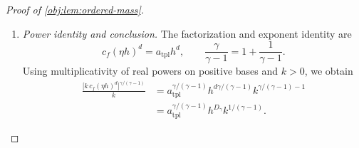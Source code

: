 \documentclass[11pt]{article}
\begin{document}
\begin{proof}[Proof of \cref{obj:lem:ordered-mass}]
\begin{enumerate}
More explicitly, each microcell is the rectangle
\[
E_{Q\ell}
=
\prod_{i=1}^d
\left[
(a_Q)_i+h\left((v_\ell)_i-\frac\eta2\right),
(a_Q)_i+h\left((v_\ell)_i+\frac\eta2\right)
\right].
\]
Each coordinate interval has length \(\eta h\), so
\[
\operatorname{Leb}(E_{Q\ell})=(\eta h)^d.
\]

By \cref{obj:ass:density}, integration of the density over each microcell yields
\[
\nu(E_{Q\ell})
=
\int_{E_{Q\ell}}f(x)\,dx
\ge c_f\operatorname{Leb}(E_{Q\ell})
=c_f(\eta h)^d.
\]
The selected microcells are measurable and pairwise disjoint. Thus
\[
\begin{aligned}
\nu(E_k)
&=
\sum_{Q\in\mathcal Q_{h,k}}
\nu(E_{Q,\ell_{\min}(Q)})\\
&\ge k\,c_f(\eta h)^d.
\end{aligned}
\]

The exponent \(\gamma/(\gamma-1)\) and the setwise coefficient are positive. Applying monotonicity of this power and the setwise estimate already established gives
\[
\begin{aligned}
&\frac{\gamma-1}{\gamma}\,
C^{-1/(\gamma-1)}
\bigl[k\,c_f(\eta h)^d\bigr]^{\gamma/(\gamma-1)}\\
&\qquad\le
\frac{\gamma-1}{\gamma}\,
C^{-1/(\gamma-1)}
\nu(E_k)^{\gamma/(\gamma-1)}
\le P(A=1,X\in E_k).
\end{aligned}
\]

\item \emph{Power identity and conclusion.}
The factorization and exponent identity are
\[
c_f(\eta h)^d=a_{\mathrm{tpl}}h^d,
\qquad
\frac{\gamma}{\gamma-1}
=
1+\frac1{\gamma-1}.
\]
Using multiplicativity of real powers on positive bases and \(k>0\), we obtain
\[
\begin{aligned}
\frac{\bigl[k\,c_f(\eta h)^d\bigr]^{\gamma/(\gamma-1)}}{k}
&=
a_{\mathrm{tpl}}^{\gamma/(\gamma-1)}
h^{d\gamma/(\gamma-1)}
k^{\gamma/(\gamma-1)-1}\\
&=
a_{\mathrm{tpl}}^{\gamma/(\gamma-1)}
h^{D_\gamma}k^{1/(\gamma-1)}.
\end{aligned}
\]


\end{enumerate}
\end{proof}
\end{document}
